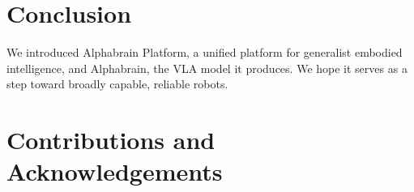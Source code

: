 \documentclass[11pt]{article}
\newcommand{\model}{\mbox{Alphabrain}}
\newcommand{\platform}{Alphabrain Platform}
\begin{document}
\section{Conclusion}\label{sec:conclusion}
We introduced \platform{}, a unified platform for generalist embodied
intelligence, and \model{}, the VLA model it produces. We hope it serves as a
step toward broadly capable, reliable robots.






\section*{Contributions and Acknowledgements}\label{sec:contrib}





\end{document}
